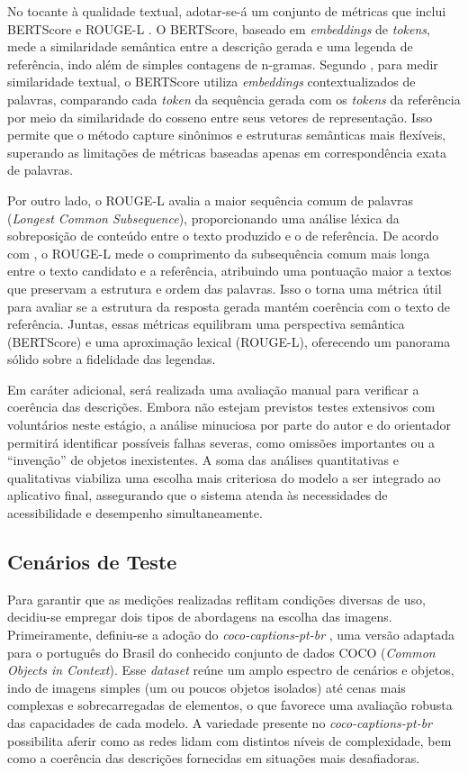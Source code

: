 No tocante à qualidade textual, adotar-se-á um conjunto de métricas que inclui BERTScore \cite{Zhang2020:} e ROUGE-L \cite{lin-2004-rouge}. O BERTScore, baseado em \textit{embeddings} de \textit{tokens}, mede a similaridade semântica entre a descrição gerada e uma legenda de referência, indo além de simples contagens de n-gramas. Segundo , para medir similaridade textual, o BERTScore utiliza \textit{embeddings} contextualizados de palavras, comparando cada \textit{token} da sequência gerada com os \textit{tokens} da referência por meio da similaridade do cosseno entre seus vetores de representação. Isso permite que o método capture sinônimos e estruturas semânticas mais flexíveis, superando as limitações de métricas baseadas apenas em correspondência exata de palavras.

Por outro lado, o ROUGE-L avalia a maior sequência comum de palavras (\textit{Longest Common Subsequence}), proporcionando uma análise léxica da sobreposição de conteúdo entre o texto produzido e o de referência. De acordo com , o ROUGE-L mede o comprimento da subsequência comum mais longa entre o texto candidato e a referência, atribuindo uma pontuação maior a textos que preservam a estrutura e ordem das palavras. Isso o torna uma métrica útil para avaliar se a estrutura da resposta gerada mantém coerência com o texto de referência. Juntas, essas métricas equilibram uma perspectiva semântica (BERTScore) e uma aproximação lexical (ROUGE-L), oferecendo um panorama sólido sobre a fidelidade das legendas.

Em caráter adicional, será realizada uma avaliação manual para verificar a coerência das descrições. Embora não estejam previstos testes extensivos com voluntários neste estágio, a análise minuciosa por parte do autor e do orientador permitirá identificar possíveis falhas severas, como omissões importantes ou a “invenção” de objetos inexistentes. A soma das análises quantitativas e qualitativas viabiliza uma escolha mais criteriosa do modelo a ser integrado ao aplicativo final, assegurando que o sistema atenda às necessidades de acessibilidade e desempenho simultaneamente.

\subsection{Cenários de Teste}

Para garantir que as medições realizadas reflitam condições diversas de uso, decidiu-se empregar dois tipos de abordagens na escolha das imagens. Primeiramente, definiu-se a adoção do \textit{coco-captions-pt-br} \cite{bromonschenkel2024cocopt}, uma versão adaptada para o português do Brasil do conhecido conjunto de dados COCO (\textit{Common Objects in Context}). Esse \textit{dataset} reúne um amplo espectro de cenários e objetos, indo de imagens simples (um ou poucos objetos isolados) até cenas mais complexas e sobrecarregadas de elementos, o que favorece uma avaliação robusta das capacidades de cada modelo. A variedade presente no \textit{coco-captions-pt-br} possibilita aferir como as redes lidam com distintos níveis de complexidade, bem como a coerência das descrições fornecidas em situações mais desafiadoras.

